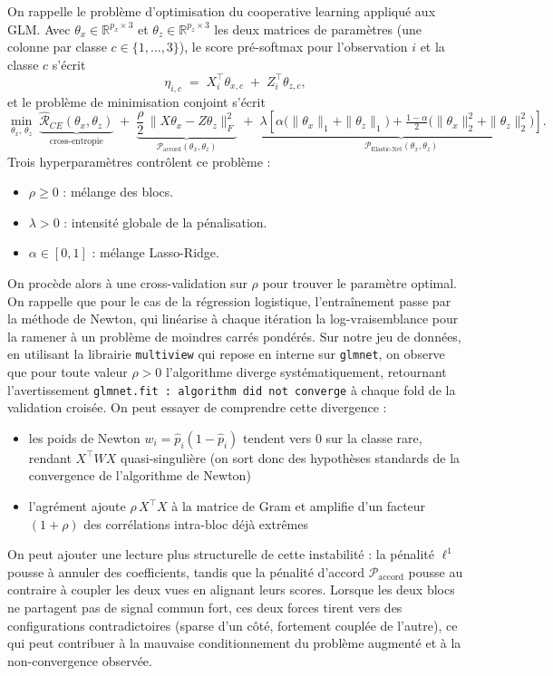 \documentclass[a4paper,11pt]{paper}
\theoremstyle{plain}
\theoremstyle{definition}
\theoremstyle{remark}
\begin{document}
On rappelle le problème d'optimisation du cooperative learning appliqué aux GLM. Avec $\theta_x \in \mathbb{R}^{p_x \times 3}$ et $\theta_z \in \mathbb{R}^{p_z \times 3}$ les deux matrices de paramètres (une colonne par classe $c \in \{1,\dots,3\}$),
le score pré-softmax pour l'observation $i$ et la classe $c$ s'écrit
\[
    \eta_{i,c} \;=\; X_i^{\!\top}\theta_{x,c} \;+\; Z_i^{\!\top}\theta_{z,c},
\]
et le problème de minimisation conjoint s'écrit
\[
    \min_{\theta_x,\,\theta_z}\;
    \underbrace{\hat{\mathcal{R}}_{CE}(\theta_x,\theta_z)}_{\text{cross-entropie}}
    \;+\;
    \underbrace{\frac{\rho}{2}\,\bigl\|X\theta_x - Z\theta_z\bigr\|_F^{2}}_{\mathcal{P}_{\text{accord}}(\theta_x,\theta_z)}
    \;+\;
    \underbrace{\lambda\!\left[\alpha\bigl(\|\theta_x\|_1+\|\theta_z\|_1\bigr)
            + \tfrac{1-\alpha}{2}\bigl(\|\theta_x\|_2^{2}+\|\theta_z\|_2^{2}\bigr)\right]}_{\mathcal{P}_{\text{Elastic-Net}}(\theta_x,\theta_z)}.
\]
Trois hyperparamètres contrôlent ce problème :
\begin{itemize}
    \item $\rho \geqslant 0$ : mélange des blocs.
    \item $\lambda > 0$ : intensité globale de la pénalisation.
    \item $\alpha \in [0,1]$ : mélange Lasso-Ridge.
\end{itemize}

On procède alors à une cross-validation sur $\rho$ pour trouver le paramètre optimal. On rappelle que pour le cas de la régression logistique, l'entraînement passe par la méthode de Newton, qui linéarise à chaque itération la log-vraisemblance pour la ramener à un problème de moindres carrés pondérés.
Sur notre jeu de données, en utilisant la librairie \verb|multiview| qui repose en interne sur \verb|glmnet|, on observe que pour toute valeur $\rho > 0$ l'algorithme diverge systématiquement, retournant l'avertissement \verb|glmnet.fit : algorithm did not converge| à chaque fold de la validation croisée. On peut essayer de comprendre cette divergence :
\begin{itemize}
    \item les poids de Newton $w_i = \hat p_i(1-\hat p_i)$ tendent vers $0$ sur la classe rare, rendant $X^{\!\top} W X$ quasi-singulière (on sort donc des hypothèses standards de la convergence de l'algorithme de Newton)
    \item l'agrément ajoute $\rho\,X^{\!\top}X$ à la matrice de Gram et amplifie d'un facteur $(1+\rho)$ des corrélations intra-bloc déjà extrêmes
\end{itemize}
On peut ajouter une lecture plus structurelle de cette instabilité : la pénalité $\ell^1$ pousse à annuler des coefficients, tandis que la pénalité d'accord $\mathcal P_{\text{accord}}$ pousse au contraire à coupler les deux vues en alignant leurs scores. Lorsque les deux blocs ne partagent pas de signal commun fort, ces deux forces tirent vers des configurations contradictoires (sparse d'un côté, fortement couplée de l'autre), ce qui peut contribuer à la mauvaise conditionnement du problème augmenté et à la non-convergence observée.
\end{document}
